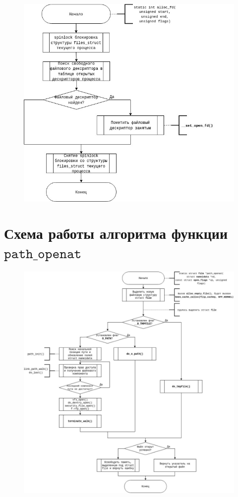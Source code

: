 \documentclass[12pt]{report}
\begin{document}
\begin{figure}[H]
	\centering
	\includegraphics[scale=0.35]{img/alloc_fd.jpg}
	\label{fig:alloc_fd}
\end{figure}

\section{Схема работы алгоритма функции $\texttt{path\_openat}$}

\begin{figure}[H]
	\centering
	\includegraphics[scale=0.54]{img/path_openat.jpg}
	\label{fig:path_openat}
\end{figure}
\end{document}

